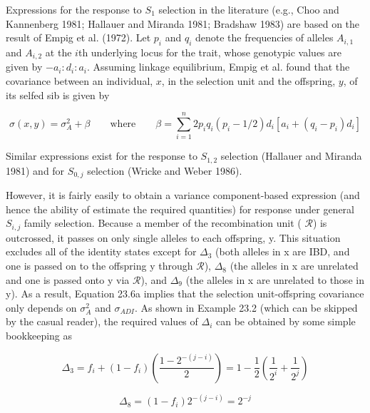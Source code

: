 \documentclass{article}
\begin{document}
Expressions for the response to $S_{1}$ selection in the literature (e.g., Choo and Kannenberg 1981; Hallauer and Miranda 1981; Bradshaw 1983) are based on the result of Empig et al. (1972). Let $p_{i}$ and $q_{i}$ denote the frequencies of alleles $A_{i,1}$ and $A_{i,2}$ at the $i$th underlying locus for the trait, whose genotypic values are given by $-a_{i}:d_{i}:a_{i}$. Assuming linkage equilibrium, Empig et al. found that the covariance between an individual, $x$, in the selection unit and the offspring, $y$, of its selfed sib is given by

\begin{equation}
\sigma(x,y)=\sigma_{A}^{2}+\beta\qquad\mathrm{w h e r e}\qquad\beta=\sum_{i=1}^{n}2p_{i}q_{i}(p_{i}-1/2)d_{i}[a_{i}+(q_{i}-p_{i})d_{i}]
\tag{23.12}
\label{eq:23_12}
\end{equation}

Similar expressions exist for the response to  $ S_{1,2} $ selection (Hallauer and Miranda 1981) and for  $ S_{0,j} $ selection (Wricke and Weber 1986).

However, it is fairly easily to obtain a variance component-based expression (and hence the ability of estimate the required quantities) for response under general  $ S_{i,j} $ family selection. Because a member of the recombination unit ( $ \mathcal{R} $) is outcrossed, it passes on only single alleles to each offspring, y. This situation excludes all of the identity states except for  $ \Delta_3 $ (both alleles in x are IBD, and one is passed on to the offspring y through  $ \mathcal{R} $),  $ \Delta_8 $ (the alleles in x are unrelated and one is passed onto y via  $ \mathcal{R} $), and  $ \Delta_9 $ (the alleles in x are unrelated to those in y). As a result, Equation 23.6a implies that the selection unit-offspring covariance only depends on  $ \sigma_A^2 $ and  $ \sigma_{ADI} $. As shown in Example 23.2 (which can be skipped by the casual reader), the required values of  $ \Delta_i $ can be obtained by some simple bookkeeping as

\begin{equation}
\Delta_{3}=f_{i}+\left(1-f_{i}\right)\left(\frac{1-2^{-\left(j-i\right)}}{2}\right)=1-\frac{1}{2}\left(\frac{1}{2^{i}}+\frac{1}{2^{j}}\right)
\tag{23.13a}
\label{eq:23_13a}
\end{equation}

\begin{equation}
\Delta_{8}=(1-f_{i})2^{-(j-i)}=2^{-j}
\tag{23.13b}
\label{eq:23_13b}
\end{equation}
\end{document}
